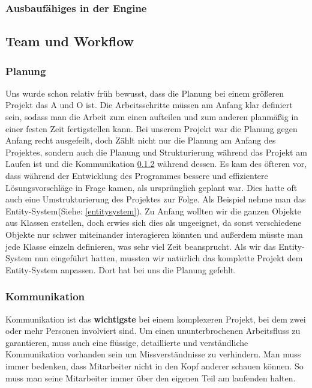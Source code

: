 \subsubsection{Ausbaufähiges in der Engine}

\subsection{Team und Workflow}
\subsubsection{Planung}
Uns wurde schon relativ früh bewusst, dass die Planung bei einem größeren Projekt das A und O ist. Die Arbeitsschritte müssen am Anfang klar definiert sein, sodass man die Arbeit zum einen aufteilen und zum anderen planmäßig in einer festen Zeit fertigstellen kann.
Bei unserem Projekt war die Planung gegen Anfang recht ausgefeilt, doch Zählt nicht nur die Planung am Anfang des Projektes, sondern auch die Planung und Strukturierung während das Projekt am Laufen ist und die Kommunikation \ref{kommunikation} während dessen. Es kam des öfteren vor, dass während der Entwicklung des Programmes bessere und effizientere Lösungsvorschläge in Frage kamen, als ursprünglich geplant war. Dies hatte oft auch eine Umstrukturierung des Projektes zur Folge. Als Beispiel nehme man das Entity-System(Siehe: \ref{entitysystem}). Zu Anfang wollten wir die ganzen Objekte aus Klassen erstellen, doch erwies sich dies als ungeeignet, da sonst verschiedene Objekte nur schwer miteinander interagieren könnten und außerdem müsste man jede Klasse einzeln definieren, was sehr viel Zeit beansprucht. 
Als wir das Entity-System nun eingeführt hatten, mussten wir natürlich das komplette Projekt dem Entity-System anpassen. Dort hat bei uns die Planung gefehlt.
                                                                                      
\subsubsection{Kommunikation}
\label{kommunikation}
Kommunikation ist das \textbf{wichtigste} bei einem komplexeren Projekt, bei dem zwei oder mehr Personen involviert sind. Um einen ununterbrochenen Arbeitsfluss zu garantieren, muss auch eine flüssige, detaillierte und verständliche Kommunikation vorhanden sein um Missverständnisse zu verhindern. Man muss immer bedenken, dass Mitarbeiter nicht in den Kopf anderer schauen können. So muss man seine Mitarbeiter immer über den eigenen Teil am laufenden halten.


